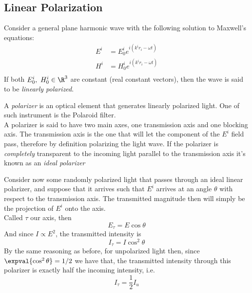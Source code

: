 \documentclass[../electromagnetism.tex]{subfiles}
\begin{document}
\subsection{Linear Polarization}
\begin{dfn}
	Consider a general plane harmonic wave with the following solution to Maxwell's equations:
	\begin{equation*}
		\begin{aligned}
			E^i&=E_0^ie^{i\left( k^ir_i-\omega t \right)}\\
			H^i&=H_0^ie^{i\left( k^ir_i-\omega t \right)}\\
		\end{aligned}
	\end{equation*}
	If both $E_0^i,\ H_0^i\in\R^3$ are constant (real constant vectors), then the wave is said to be \textit{linearly polarized}.
\end{dfn}
\begin{dfn}[Polarizer]
	A \textit{polarizer} is an optical element that generates linearly polarized light. One of such instrument is the Polaroid filter.\\
	A polarizer is said to have two main axes, one transmission axis and one blocking axis. The transmission axis is the one that will let the component of the $E^i$ field pass, therefore by definition polarizing the light wave. If the polarizer is \emph{completely} transparent to the incoming light parallel to the transmission axis it's known as an \textit{ideal polarizer}
\end{dfn}
Consider now some randomly polarized light that passes through an ideal linear polarizer, and suppose that it arrives such that $E^i$ arrives at an angle $\theta$ with respect to the transmission axis. The transmitted magnitude then will simply be the projection of $E^i$ onto the axis.\\
Called $\tau$ our axis, then
\begin{equation*}
	E_\tau=E\cos\theta
\end{equation*}
And since $I\propto E^2$, the transmitted intensity is
\begin{equation*}
	I_\tau=I\cos^2\theta
\end{equation*}
By the same reasoning as before, for unpolarized light then, since $\expval{\cos^2\theta}=1/2$ we have that, the transmitted intensity through this polarizer is exactly half the incoming intensity, i.e.
\begin{equation*}
	I_\tau=\frac{1}{2}I_u
\end{equation*}
\end{document}
